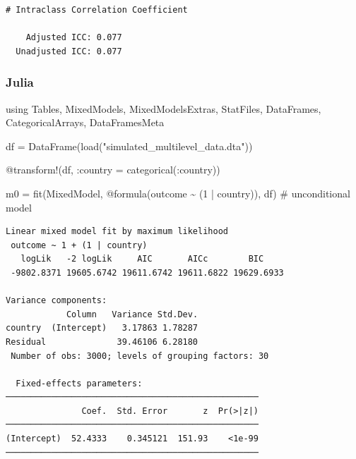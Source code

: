 \documentclass[
  letterpaper,
  DIV=11,
  numbers=noendperiod]{scrreprt}
\newenvironment{Shaded}{\begin{snugshade}}{\end{snugshade}}
\newcommand{\BuiltInTok}[1]{\textcolor[rgb]{0.00,0.23,0.31}{#1}}
\newcommand{\CommentTok}[1]{\textcolor[rgb]{0.37,0.37,0.37}{#1}}
\newcommand{\FloatTok}[1]{\textcolor[rgb]{0.68,0.00,0.00}{#1}}
\newcommand{\FunctionTok}[1]{\textcolor[rgb]{0.28,0.35,0.67}{#1}}
\newcommand{\ImportTok}[1]{\textcolor[rgb]{0.00,0.46,0.62}{#1}}
\newcommand{\NormalTok}[1]{\textcolor[rgb]{0.00,0.23,0.31}{#1}}
\newcommand{\OperatorTok}[1]{\textcolor[rgb]{0.37,0.37,0.37}{#1}}
\newcommand{\PreprocessorTok}[1]{\textcolor[rgb]{0.68,0.00,0.00}{#1}}
\newcommand{\StringTok}[1]{\textcolor[rgb]{0.13,0.47,0.30}{#1}}
\begin{document}
\begin{verbatim}
# Intraclass Correlation Coefficient

    Adjusted ICC: 0.077
  Unadjusted ICC: 0.077
\end{verbatim}

\subsubsection{Julia}

\begin{Shaded}
\begin{Highlighting}[]
\ImportTok{using} \BuiltInTok{Tables}\NormalTok{, }\BuiltInTok{MixedModels}\NormalTok{, }\BuiltInTok{MixedModelsExtras}\NormalTok{, }
\BuiltInTok{StatFiles}\NormalTok{, }\BuiltInTok{DataFrames}\NormalTok{, }\BuiltInTok{CategoricalArrays}\NormalTok{, }\BuiltInTok{DataFramesMeta}

\NormalTok{df }\OperatorTok{=} \FunctionTok{DataFrame}\NormalTok{(}\FunctionTok{load}\NormalTok{(}\StringTok{"simulated\_multilevel\_data.dta"}\NormalTok{))}
\end{Highlighting}
\end{Shaded}

\begin{Shaded}
\begin{Highlighting}[]
\PreprocessorTok{@transform}\NormalTok{!(df, }\OperatorTok{:}\NormalTok{country }\OperatorTok{=} \FunctionTok{categorical}\NormalTok{(}\OperatorTok{:}\NormalTok{country))}
\end{Highlighting}
\end{Shaded}

\begin{Shaded}
\begin{Highlighting}[]

\NormalTok{m0 }\OperatorTok{=} \FunctionTok{fit}\NormalTok{(MixedModel, }
         \PreprocessorTok{@formula}\NormalTok{(outcome }\OperatorTok{\textasciitilde{}}\NormalTok{ (}\FloatTok{1} \OperatorTok{|}\NormalTok{ country)), df) }\CommentTok{\# unconditional model}
\end{Highlighting}
\end{Shaded}

\begin{verbatim}
Linear mixed model fit by maximum likelihood
 outcome ~ 1 + (1 | country)
   logLik   -2 logLik     AIC       AICc        BIC    
 -9802.8371 19605.6742 19611.6742 19611.6822 19629.6933

Variance components:
            Column   Variance Std.Dev.
country  (Intercept)   3.17863 1.78287
Residual              39.46106 6.28180
 Number of obs: 3000; levels of grouping factors: 30

  Fixed-effects parameters:
──────────────────────────────────────────────────
               Coef.  Std. Error       z  Pr(>|z|)
──────────────────────────────────────────────────
(Intercept)  52.4333    0.345121  151.93    <1e-99
──────────────────────────────────────────────────
\end{verbatim}
\end{document}
